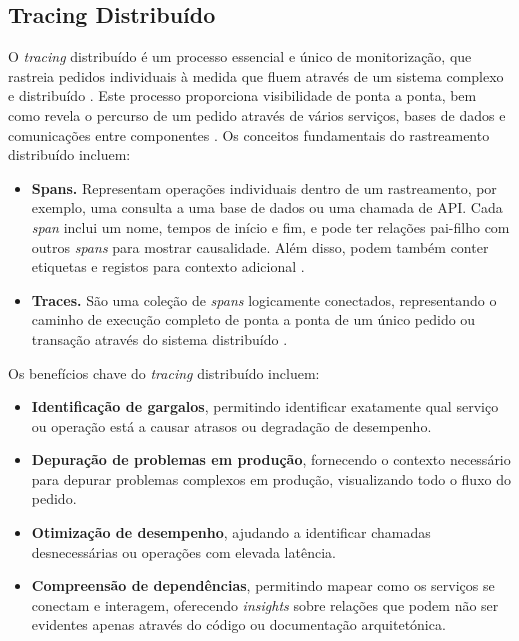 \subsection{Tracing Distribuído}

O \textit{tracing} distribuído é um processo essencial e único de monitorização, que rastreia pedidos individuais à medida que fluem através de um sistema complexo e distribuído \cite{Sambasivan2014}. Este processo proporciona visibilidade de ponta a ponta, bem como revela o percurso de um pedido através de vários serviços, bases de dados e comunicações entre componentes \cite{Zhang2023}. Os conceitos fundamentais do rastreamento distribuído incluem:

\begin{itemize}
    \item \textbf{Spans.} Representam operações individuais dentro de um rastreamento, por exemplo, uma consulta a uma base de dados ou uma chamada de API. Cada \textit{span} inclui um nome, tempos de início e fim, e pode ter relações pai-filho com outros \textit{spans} para mostrar causalidade. Além disso, podem também conter etiquetas e registos para contexto adicional \cite{Sambasivan2014}.

    \item \textbf{Traces.} São uma coleção de \textit{spans} logicamente conectados, representando o caminho de execução completo de ponta a ponta de um único pedido ou transação através do sistema distribuído \cite{Sambasivan2014}.
\end{itemize}

Os benefícios chave do \textit{tracing} distribuído incluem:

\begin{itemize}
    \item \textbf{Identificação de gargalos}, permitindo identificar exatamente qual serviço ou operação está a causar atrasos ou degradação de desempenho.

    \item \textbf{Depuração de problemas em produção}, fornecendo o contexto necessário para depurar problemas complexos em produção, visualizando todo o fluxo do pedido.

    \item \textbf{Otimização de desempenho}, ajudando a identificar chamadas desnecessárias ou operações com elevada latência.

    \item \textbf{Compreensão de dependências}, permitindo mapear como os serviços se conectam e interagem, oferecendo \textit{insights} sobre relações que podem não ser evidentes apenas através do código ou documentação arquitetónica.
\end{itemize}


